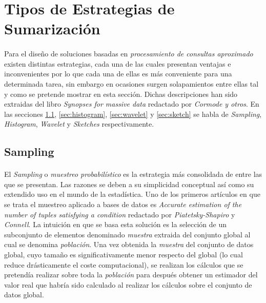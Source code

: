\documentclass{subfiles}
\begin{document}
    \section{Tipos de Estrategias de Sumarización}
    \label{sec:summaries_types}

      \paragraph{}
      Para el diseño de soluciones basadas en \emph{procesamiento de consultas aproximado} existen distintas estrategias, cada una de las cuales presentan ventajas e inconvenientes por lo que cada una de ellas es más conveniente para una determinada tarea, sin embargo en ocasiones surgen solapamientos entre ellas tal y como se pretende mostrar en esta sección. Dichas descripciones han sido extraidas del libro \emph{Synopses for massive data} \cite{cormode2012synopses} redactado por \emph{Cormode y otros}. En las secciones \ref{sec:sampling}, \ref{sec:histogram}, \ref{sec:wavelet} y \ref{sec:sketch} se habla de \emph{Sampling}, \emph{Histogram}, \emph{Wavelet} y \emph{Sketches} respectivamente.

      \subsection{Sampling}
      \label{sec:sampling}

        \paragraph{}
        El \emph{Sampling} o \emph{muestreo probabilístico} es la estrategia más consolidada de entre las que se presentan. Las razones se deben a su simplicidad conceptual así como su extendido uso en el mundo de la estadística. Uno de los primeros artículos en que se trata el muestreo aplicado a bases de datos es \emph{Accurate estimation of the number of tuples satisfying a condition} \cite{piatetsky1984accurate} redactado por \emph{Piatetsky-Shapiro} y \emph{Connell}. La intuición en que se basa esta solución es la selección de un subconjunto de elementos denominado \emph{muestra} extraida del conjunto global al cual se denomina \emph{población}. Una vez obtenida la \emph{muestra} del conjunto de datos global, cuyo tamaño es significativamente menor respecto del global (lo cual reduce drásticamente el coste computacional), se realizan los cálculos que se pretendía realizar sobre toda la \emph{población} para después obtener un estimador del valor real que habría sido calculado al realizar los cálculos sobre el conjunto de datos global.
\end{document}

